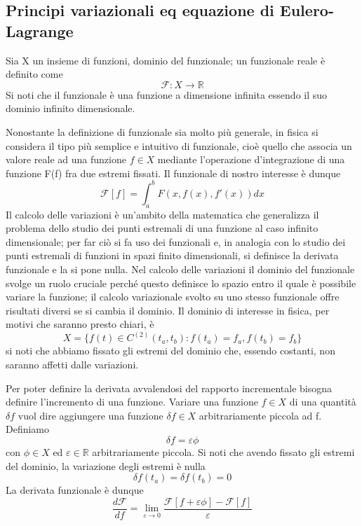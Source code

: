 \documentclass[
10pt, %
a4paper, %
oneside, %
headinclude,footinclude, %
BCOR5mm, %
]{scrartcl}
\begin{document}
\subsection{Principi variazionali eq equazione di Eulero-Lagrange}
\begin{definizione}
	Sia X un insieme di funzioni, dominio del funzionale; un funzionale reale è definito come
	\[\mathcal{F}:X\rightarrow\mathbb{R}\]
	Si noti che il funzionale è una funzione a dimensione infinita essendo il suo dominio infinito dimensionale.
\end{definizione}
Nonostante la definizione di funzionale sia molto più generale, in fisica si considera il tipo più semplice e intuitivo di funzionale, cioè quello che associa un valore reale ad una funzione \(f\in X\) mediante l'operazione d'integrazione di una funzione F(f) fra due estremi fissati. Il funzionale di nostro interesse è dunque
\[\mathcal{F}[f] = \int_{a}^{b}F(x, f(x), f'(x))dx\]
Il calcolo delle variazioni è un'ambito della matematica che generalizza il problema dello studio dei punti estremali di una funzione al caso infinito dimensionale; per far ciò si fa uso dei funzionali e, in analogia con lo studio dei punti estremali di funzioni in spazi finito dimensionali, si definisce la derivata funzionale e la si pone nulla. Nel calcolo delle variazioni il dominio del funzionale svolge un ruolo cruciale perché questo definisce lo spazio entro il quale è possibile variare la funzione; il calcolo variazionale svolto su uno stesso funzionale offre risultati diversi se si cambia il dominio. Il dominio di interesse in fisica, per motivi che saranno presto chiari, è
\[X = \{f(t)\in C^{(2)}(t_a, t_b): f(t_a) = f_a, f(t_b) = f_b\}\]
si noti che abbiamo fissato gli estremi del dominio che, essendo costanti, non saranno affetti dalle variazioni.
\begin{definizione}
	Per poter definire la derivata avvalendosi del rapporto incrementale bisogna definire l'incremento di una funzione. Variare una funzione \(f\in X\) di una quantità \(\delta f\) vuol dire aggiungere una funzione \(\delta f\in X\) arbitrariamente piccola ad f. Definiamo
	\[\delta f = \varepsilon\phi\]
	con $\phi\in X$ ed $\varepsilon\in \mathbb{R}$ arbitrariamente piccola. Si noti che avendo fissato gli estremi del dominio, la variazione degli estremi è nulla
	\[\delta f(t_a) = \delta f(t_b) = 0\]
	 La derivata funzionale è dunque
	\[\frac{d\mathcal{F}}{df} = \lim_{\varepsilon\to 0}\frac{\mathcal{F}[f+\varepsilon\phi]-\mathcal{F}[f]}{\varepsilon}\]	
\end{definizione} 
\end{document}
